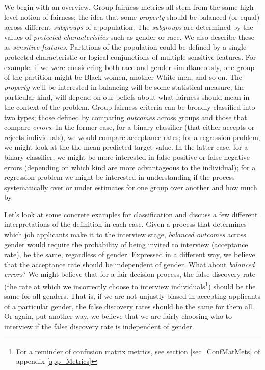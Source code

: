 We begin with an overview. Group fairness metrics all stem from the same high level notion of fairness; the idea that some \emph{property} should be balanced (or equal) across different \emph{subgroups} of a population. The \emph{subgroups} are determined by the values of \emph{protected characteristics} such as gender or race. We also describe these as \emph{sensitive features}. Partitions of the population could be defined by a single protected characteristic or logical conjunctions of multiple sensitive features. For example, if we were considering both race and gender simultaneously, one group of the partition might be Black women, another White men, and so on. The \emph{property} we'll be interested in balancing will be some statistical measure; the particular kind, will depend on our beliefs about what fairness should mean in the context of the problem. Group fairness criteria can be broadly classified into two types; those defined by comparing \emph{outcomes} across groups and those that compare \emph{errors}. In the former case, for a binary classifier (that either accepts or rejects individuals), we would compare acceptance rates; for a regression problem, we might look at the the mean predicted target value. In the latter case, for a binary classifier, we might be more interested in false positive or false negative errors (depending on which kind are more advantageous to the individual); for a regression problem we might be interested in understanding if the process systematically over or under estimates for one group over another and how much by.

Let's look at some concrete examples for classification and discuss a few different interpretations of the definition in each case. Given a process that determines which job applicants make it to the interview stage, \emph{balanced outcomes} across gender would require the probability of being invited to interview (acceptance rate), be the same, regardless of gender. Expressed in a different way, we believe that the acceptance rate should be independent of gender. What about \emph{balanced errors}? We might believe that for a fair decision process, the false discovery rate (the rate at which we incorrectly choose to interview individuals\footnote{For a reminder of confusion matrix metrics, see section \ref{sec_ConfMatMets} of appendix \ref{app_Metrics}}) should be the same for all genders. That is, if we are not unjustly biased in accepting applicants of a particular gender, the false discovery rates should be the same for them all. Or again, put another way, we believe that we are fairly choosing who to interview if the false discovery rate is independent of gender. 

